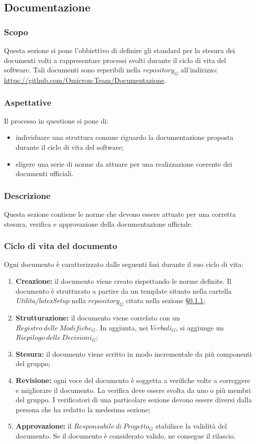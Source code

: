 \subsection{Documentazione}\label{3.1}

\subsubsection{Scopo}\label{3.1.1}
Questa sezione si pone l'obbiettivo di definire gli standard per la stesura dei documenti volti a rappresentare processi svolti durante il ciclo di vita del software. Tali documenti sono reperibili nella $repository_{G}$ all'indirizzo: \url{https://github.com/Omicron-Team/Documentazione}.

\subsubsection{Aspettative}
Il processo in questione si pone di:
\begin{itemize}
\item individuare una struttura comune riguardo la documentazione proposta durante il ciclo di vita del software;
\item eligere una serie di norme da attuare per una realizzazione coerente dei documenti ufficiali.
\end{itemize}

\subsubsection{Descrizione}
Questa sezione contiene le norme che devono essere attuate per una corretta stesura, verifica e approvazione della documentazione ufficiale.

\subsubsection{Ciclo di vita del documento}
Ogni documento è caratterizzato dalle seguenti fasi durante il suo ciclo di vita:
\begin{enumerate}
	\item \textbf{Creazione:} il documento viene creato rispettando le norme definite. Il documento è strutturato a partire da un template situato nella cartella \textit{Utilita/latexSetup} nella $repository_G$ citata nella sezione §\ref{3.1.1};
	\item \textbf{Strutturazione:} il documento viene correlato con un $Registro\:delle\: Modifiche_G$. In aggiunta, nei $Verbali_G$, si aggiunge un $Riepilogo\:delle\:Decisioni_G$;
	\item \textbf{Stesura:} il documento viene scritto in modo incrementale da più componenti del gruppo;
	\item \textbf{Revisione:} ogni voce del documento è soggetta a verifiche volte a correggere e migliorare il documento. La verifica deve essere svolta da uno o più membri del gruppo. I verificatori di una particolare sezione devono essere diversi dalla persona che ha redatto la medesima sezione;
	\item \textbf{Approvazione:} il $Responsabile\:di\:Progetto_G$ stabilisce la validità del documento. Se il documento è considerato valido, ne consegue il rilascio.
\end{enumerate}